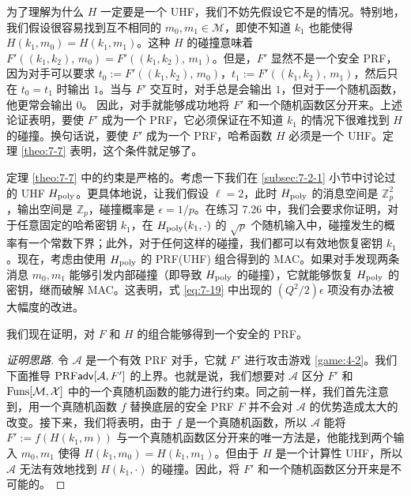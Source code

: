 为了理解为什么 $H$ 一定要是一个 UHF，我们不妨先假设它不是的情况。特别地，我们假设很容易找到互不相同的 $m_0,m_1\in\mathcal{M}$，即使不知道 $k_1$ 也能使得 $H(k_1,m_0)=H(k_1,m_1)$。这种 $H$ 的碰撞意味着$F'((k_1,k_2),\,m_0)=F'((k_1,k_2),\,m_1)$。但是，$F'$ 显然不是一个安全 PRF，因为对手可以要求 $t_0:=F'((k_1,k_2),\,m_0)$，$t_1:=F'((k_1,k_2),\,m_1)$，然后只在 $t_0=t_1$ 时输出 $1$。当与 $F'$ 交互时，对手总是会输出 $1$，但对于一个随机函数，他更常会输出 $0$。 因此，对手就能够成功地将 $F'$ 和一个随机函数区分开来。上述论证表明，要使 $F'$ 成为一个 PRF，它必须保证在不知道 $k_1$ 的情况下很难找到 $H$ 的碰撞。换句话说，要使 $F'$ 成为一个 PRF，哈希函数 $H$ 必须是一个 UHF。定理 \ref{theo:7-7} 表明，这个条件就足够了。

\begin{remark}\label{remark:7-2}
定理 \ref{theo:7-7} 中的约束是严格的。考虑一下我们在 \ref{subsec:7-2-1} 小节中讨论过的 UHF $H_{\rm poly}$。更具体地说，让我们假设 $\ell=2$，此时 $H_{\rm poly}$ 的消息空间是 $\mathbb{Z}^2_p$，输出空间是 $\mathbb{Z}_p$，碰撞概率是 $\epsilon={1}/{p}$。在练习 7.26 中，我们会要求你证明，对于任意固定的哈希密钥 $k_1$，在 $H_{\rm poly}(k_1,\cdot)$ 的 $\sqrt{p}$ 个随机输入中，碰撞发生的概率有一个常数下界；此外，对于任何这样的碰撞，我们都可以有效地恢复密钥 $k_1$。现在，考虑由使用 $H_{\rm poly}$ 的 PRF(UHF) 组合得到的 MAC。如果对手发现两条消息 $m_0,m_1$ 能够引发内部碰撞（即导致 $H_{\rm poly}$ 的碰撞），它就能够恢复 $H_{\rm poly}$ 的密钥，继而破解 MAC。这表明，式 \ref{eq:7-19} 中出现的 ${(Q^2/2)\epsilon}$ 项没有办法被大幅度的改进。
\end{remark}

\begin{snote}
我们现在证明，对 $F$ 和 $H$ 的组合能够得到一个安全的 PRF。
\end{snote}

\begin{proof}[证明思路]
令 $\mathcal{A}$ 是一个有效 PRF 对手，它就 $F'$ 进行攻击游戏 \ref{game:4-2}。我们下面推导 ${\rm PRF}\mathsf{adv}[\mathcal{A},F']$ 的上界。也就是说，我们想要对 $\mathcal{A}$ 区分 $F'$ 和 ${\rm Funs}[\mathcal{M},\mathcal{X}]$ 中的一个真随机函数的能力进行约束。同之前一样，我们首先注意到，用一个真随机函数 $f$ 替换底层的安全 PRF $F$ 并不会对 $\mathcal{A}$ 的优势造成太大的改变。接下来，我们将表明，由于 $f$ 是一个真随机函数，所以 $\mathcal{A}$ 能将 $F':=f(H(k_1,m))$ 与一个真随机函数区分开来的唯一方法是，他能找到两个输入 $m_0,m_1$ 使得 $H(k_1,m_0)=H(k_1,m_1)$。但由于 $H$ 是一个计算性 UHF，所以 $\mathcal{A}$ 无法有效地找到 $H(k_1,\cdot)$ 的碰撞。因此，将 $F'$ 和一个随机函数区分开来是不可能的。
\end{proof}

